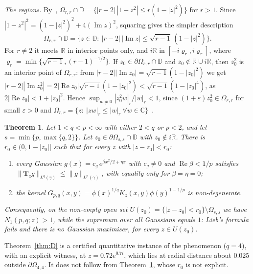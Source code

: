 \documentclass[11pt]{amsart}
\newtheorem{theorem}{Theorem}[section]
\theoremstyle{definition}
\newcommand{\R}{\mathbb{R}}
\newcommand{\C}{\mathbb{C}}
\newcommand{\Rea}{\operatorname{Re}}
\newcommand{\Ima}{\operatorname{Im}}
\newcommand{\bT}{\mathbf{T}}
\newcommand{\D}{\mathbb{D}}
\begin{document}
\emph{The regions.} By~\cite[Lemma~2.1]{DCH}, $\Omega_{r,r}\cap\D=\{|r-2|\,|1-z^2|\le r(1-|z|^2)\}$ for $r>1$. Since
$|1-z^2|^2=(1-|z|^2)^2+4(\Ima z)^2$, squaring gives the simpler description
\begin{equation}\label{eq:omegasimple}
\Omega_{r,r}\cap\D=\big\{z\in\D:\ |r-2|\,|\Ima z|\le\sqrt{r-1}\,(1-|z|^2)\big\}.
\end{equation}
For $r\ne2$ it meets $\R$ in interior points only, and $i\R$ in $[-i\varrho_r,i\varrho_r]$, where
$\varrho_r=\min\{\sqrt{r-1},(r-1)^{-1/2}\}$. If $z_0\in\partial\Omega_{r,r}\cap\D$ and $z_0\notin\R\cup i\R$, then
$z_0^2$ is an interior point of $\Omega_{r,r}$: from $|r-2||\Ima z_0|=\sqrt{r-1}(1-|z_0|^2)$ we get
$|r-2||\Ima z_0^2|=2|\Rea z_0|\sqrt{r-1}(1-|z_0|^2)<\sqrt{r-1}(1-|z_0|^4)$, as $2|\Rea z_0|<1+|z_0|^2$. Hence
$\sup_{w\ne0}|z_0^2w|_r/|w|_r<1$, since $(1+\varepsilon)z_0^2\in\Omega_{r,r}$ for small $\varepsilon>0$ and
$\Omega_{r,r}=\{z:\ |zw|_r\le|w|_r\ \forall w\in\C\}$~\cite[Lemma~2.1(b)]{DCH}.

\begin{theorem}\label{thm:open}
Let $1<q<p<\infty$ with either $2<q$ or $p<2$, and let $s=\min\{p,\max\{q,2\}\}$. Let
$z_0\in\partial\Omega_{s,s}\cap\D$ with $z_0\notin i\R$. There is $r_0\in(0,1-|z_0|]$ such that for every $z$ with
$|z-z_0|<r_0$:
\begin{enumerate}[label=(\alph*)]
\item every Gaussian $g(x)=c_g\,e^{\beta x^2/2+\eta x}$ with $c_g\ne0$ and $\Rea\beta<1/p$ satisfies
$\|\bT_zg\|_{L^q(\gamma)}\le\|g\|_{L^p(\gamma)}$, with equality only for $\beta=\eta=0$;
\item the kernel $G_{p,q}(x,y)=\phi(x)^{1/q}K_z(x,y)\phi(y)^{1-1/p}$ is non-degenerate.
\end{enumerate}
Consequently, on the non-empty open set $U(z_0)=\{|z-z_0|<r_0\}\setminus\Omega_{s,s}$ we have $N_1(p,q;z)>1$, while
the supremum over all Gaussians equals $1$: Lieb's formula fails and there is no Gaussian maximiser, for every
$z\in U(z_0)$.
\end{theorem}

Theorem~\ref{thm:D} is a certified quantitative instance of the phenomenon ($q=4$), with an explicit witness, at
$z=0.72e^{0.7i}$, which lies at radial distance about $0.025$ outside $\partial\Omega_{4,4}$. It does not follow from
Theorem~\ref{thm:open}, whose $r_0$ is not explicit.
\end{document}
